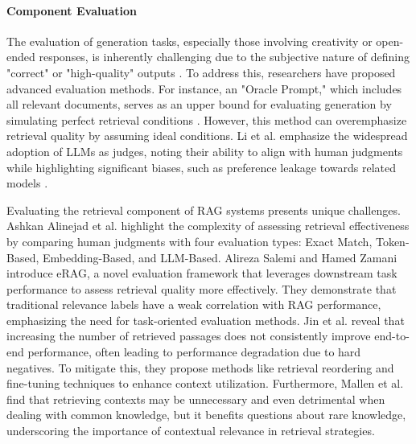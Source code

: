 \paragraph{Component Evaluation}
The evaluation of generation tasks, especially those involving creativity or open-ended responses, is inherently challenging due to the subjective nature of defining "correct" or "high-quality" outputs \cite{Yu.2024}. To address this, researchers have proposed advanced evaluation methods. For instance, an "Oracle Prompt," which includes all relevant documents, serves as an upper bound for evaluating generation by simulating perfect retrieval conditions \cite{Krishna.19.09.2024}. However, this method can overemphasize retrieval quality by assuming ideal conditions. Li et al. emphasize the widespread adoption of LLMs as judges, noting their ability to align with human judgments while highlighting significant biases, such as preference leakage towards related models \cite{Li.13.01.2025}.

Evaluating the retrieval component of RAG systems presents unique challenges. Ashkan Alinejad et al.\cite{AshkanAlinejad.2024} highlight the complexity of assessing retrieval effectiveness by comparing human judgments with four evaluation types: Exact Match, Token-Based, Embedding-Based, and LLM-Based. Alireza Salemi and Hamed Zamani \cite{Salemi.2024} introduce eRAG, a novel evaluation framework that leverages downstream task performance to assess retrieval quality more effectively. They demonstrate that traditional relevance labels have a weak correlation with RAG performance, emphasizing the need for task-oriented evaluation methods. Jin et al.\cite{Jin.08.10.2024} reveal that increasing the number of retrieved passages does not consistently improve end-to-end performance, often leading to performance degradation due to hard negatives. To mitigate this, they propose methods like retrieval reordering and fine-tuning techniques to enhance context utilization. Furthermore, Mallen et al. \cite{Mallen.2022} find that retrieving contexts may be unnecessary and even detrimental when dealing with common knowledge, but it benefits questions about rare knowledge, underscoring the importance of contextual relevance in retrieval strategies.

